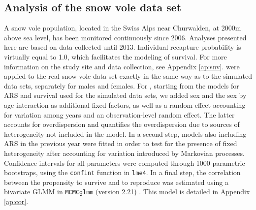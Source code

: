 \subsection{Analysis of the snow vole data set}

A snow vole population, located in the Swiss Alps near Churwalden, at 2000m above sea level, has been monitored continuously since 2006. Analyses presented here are based on data collected until 2013. Individual recapture probability is virtually equal to 1.0, which facilitates the modeling of survival. For more information on the study site and data collection, see Appendix \ref{ap:snv}. \NSM were applied to the real snow vole data set exactly in the same way as to the simulated data sets, separately for males and females.
For \MM, starting from the models for ARS and survival used for the simulated data sets, we added sex and the sex by age interaction as additional fixed factors, as well as a random effect accounting for variation among years and an observation-level random effect. The latter accounts for overdispersion \parencite[see e.g.][]{Atkins2013} and quantifies the overdispersion due to sources of heterogeneity not included in the model.
In a second step, models also including ARS in the previous year were fitted in order to test for the presence of fixed heterogeneity after accounting for variation introduced by Markovian processes. Confidence intervals for all parameters were computed through 1000 parametric bootstraps, using the \verb+confint+ function in \verb+lme4+. In a final step, the correlation between the propensity to survive and to reproduce was estimated using a bivariate GLMM in \verb+MCMCglmm+ (version 2.21) \parencite{Hadfield2010a}. This model is detailed in Appendix \ref{ap:cor}.

